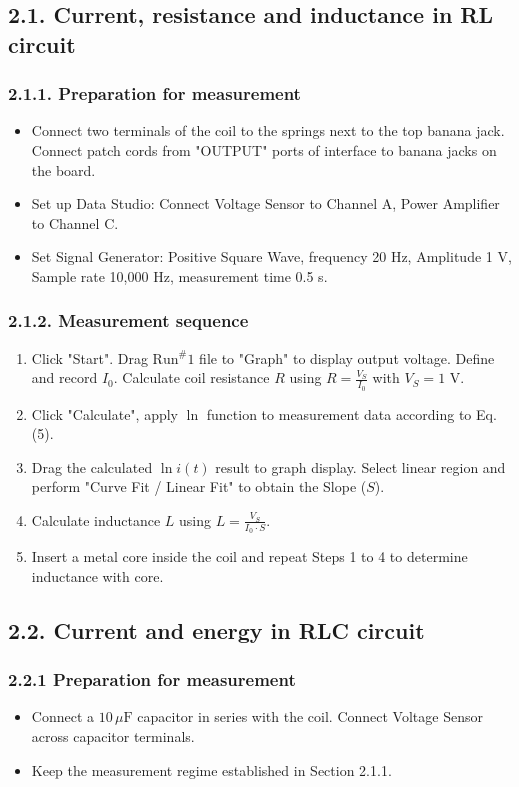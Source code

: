 \documentclass[12pt,oneside,a4paper]{article}
\theoremstyle{definition}
\begin{document}
	\subsection*{2.1. Current, resistance and inductance in RL circuit}
	\subsubsection*{2.1.1. Preparation for measurement}
	\begin{itemize}[leftmargin=1.5em]
		\item Connect two terminals of the coil to the springs next to the top banana jack. Connect patch cords from "OUTPUT" ports of interface to banana jacks on the board.
		\item Set up Data Studio: Connect Voltage Sensor to Channel A, Power Amplifier to Channel C.
		\item Set Signal Generator: Positive Square Wave, frequency 20 Hz, Amplitude 1 V, Sample rate 10,000 Hz, measurement time 0.5 s.
	\end{itemize}
	
	\subsubsection*{2.1.2. Measurement sequence}
	\begin{enumerate}[leftmargin=1.5em]
		\item Click "Start". Drag $\text{Run}^\#1$ file to "Graph" to display output voltage. Define and record $I_0$. Calculate coil resistance $R$ using $R = \frac{V_S}{I_0}$ with $V_S = 1\text{ V}$.
		\item Click "Calculate", apply $\ln$ function to measurement data according to Eq. (5).
		\item Drag the calculated $\ln i(t)$ result to graph display. Select linear region and perform "Curve Fit / Linear Fit" to obtain the Slope ($S$).
		\item Calculate inductance $L$ using $L = \frac{V_S}{I_0 \cdot S}$.
		\item Insert a metal core inside the coil and repeat Steps 1 to 4 to determine inductance with core.
	\end{enumerate}
	
	\subsection*{2.2. Current and energy in RLC circuit}
	\subsubsection*{2.2.1 Preparation for measurement}
	\begin{itemize}[leftmargin=1.5em]
		\item Connect a $10\,\mu\text{F}$ capacitor in series with the coil. Connect Voltage Sensor across capacitor terminals.
		\item Keep the measurement regime established in Section 2.1.1.
	\end{itemize}
	
\end{document}
